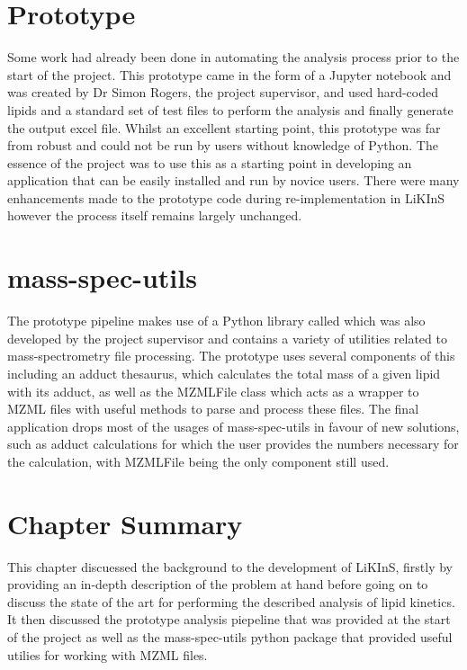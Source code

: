 \documentclass{l4proj}
\begin{document}
\section{Prototype}
Some work had already been done in automating the analysis process prior to the start of the project. This prototype came in the form of a Jupyter notebook and was created by Dr Simon Rogers, the project supervisor, and used hard-coded lipids and a standard set of test files to perform the analysis and finally generate the output excel file. Whilst an excellent starting point, this prototype was far from robust and could not be run by users without knowledge of Python. The essence of the project was to use this as a starting point in developing an application that can be easily installed and run by novice users. There were many enhancements made to the prototype code during re-implementation in LiKInS however the process itself remains largely unchanged. 


\section{mass-spec-utils}
The prototype pipeline makes use of a Python library called  which was also developed by the project supervisor and contains a variety of utilities related to mass-spectrometry file processing. The prototype uses several components of this including an adduct thesaurus, which calculates the total mass of a given lipid with its adduct, as well as the MZMLFile class which acts as a wrapper to MZML files with useful methods to parse and process these files. The final application drops most of the usages of mass-spec-utils in favour of new solutions, such as adduct calculations for which the user provides the numbers necessary for the calculation, with MZMLFile being the only component still used.


\section{Chapter Summary}
This chapter discuessed the background to the development of LiKInS, firstly by providing an in-depth description of the problem at hand before going on to discuss the state of the art for performing the described analysis of lipid kinetics. It then discussed the prototype analysis piepeline that was provided at the start of the project as well as the mass-spec-utils python package that provided useful utilies for working with MZML files.
\end{document}
